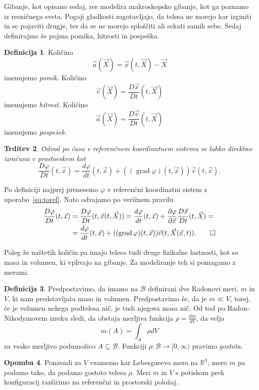 \documentclass[a4paper,twoside]{article}
\theoremstyle{definition} %
\newtheorem{definicija}{Definicija}[section]
\newtheorem{opomba}[definicija]{Opomba}
\theoremstyle{plain} %
\newtheorem{trditev}[definicija]{Trditev}
\numberwithin{equation}{section}
\newcommand{\R}{\mathbb R}
\newcommand{\B}{\mathcal{B}}
\newcommand{\grad}{\operatorname{grad}}
\renewcommand{\phi}{\varphi}
\newcommand{\dpar}[2]{\ensuremath{\frac{\partial #1}{\partial #2}}}
\newcommand{\dd}[2]{\ensuremath{\frac{d #1}{d #2}}}
\newcommand{\ddt}[1]{\dd{#1}{t}}
\newcommand{\DD}[2]{\ensuremath{\frac{D #1}{D #2}}}
\newcommand{\DDt}[1]{\DD{#1}{t}}
\newcommand{\vv}{\vec{v}}
\newcommand{\vu}{\vec{u}}
\newcommand{\va}{\vec{a}}
\newcommand{\vX}{\vec{X}}
\newcommand{\vx}{\vec{x}}
\begin{document}
Gibanje, kot opisano sedaj, res modelira makroskopsko gibanje, kot ga poznamo iz
resničnega sveta. Pogoji gladkosti zagotavljajo, da telesa ne morejo kar
izginiti in se pojaviti drugje, ter da se ne morejo sploščiti ali sekati samih
sebe. Sedaj definirajmo še pojma pomika, hitrosti in pospeška.

\begin{definicija}
  Količino \[ \vu(\vX) = \vx(t, \vX) - \vX \] imenujemo \emph{pomik}.
  Količino \[ \vv(\vX) = \DDt{\vx}(t, \vX) \] imenujemo \emph{hitrost}.
  Količino \[ \va(\vX) = \DDt{\vv}(t, \vX) \] imenujemo \emph{pospešek}.
\end{definicija}
\begin{trditev}
  Odvod po času v referenčnem koordinatnem sistemu se lahko direktno izračuna v
  prostorskem kot
  \[
  \DDt{\phi}(t, \vx) = \ddt{\phi}(t, \vx) + ((\grad \phi)(t, \vx)) \vv(t, \vx).
  \]
\end{trditev}
\proof
  Po definiciji najprej prenesemo $\phi$ v referenčni koordinatni sistem z
  uporabo~\ref{eq:toref}. Nato odvajamo po verižnem pravilu
  \begin{align*}
    \DDt \phi(t, \vx) &= \DDt \phi(t, \vx(t, \vX)) =
    \ddt \phi(t, \vx) + \dpar{\phi}{\vx} \DDt{\vx} (t, \vX) = \\
    &= \ddt \phi(t, \vx) + ((\grad \phi)(t, \vx)) \vv(t, \vX(\vx, t)). \qedhere
  \end{align*}
\endproof

Poleg že naštetih količin pa imajo telesa tudi druge fizikalne lastnosti, kot so
masa in volumen, ki vplivajo na gibanje. Za modeliranje teh si pomagamo z
merami.

\begin{definicija}
  Predpostavimo, da imamo na $\B$ definirani dve Radonovi meri, $m$ in
  $V$, ki nam predstavljata maso in volumen. Predpostavimo še, da je $m \ll V$,
  torej, če je volumen nekega podtelesa nič, je tudi njegova masa nič. Od tod po
  Radon-Nikodymovem izreku sledi, da obstaja merljiva funkcija $\rho =
  \dd{m}{V}$, da velja
  \[
    m(A) = \int_{A} \rho dV
  \]
  za vsako merljivo podmnožico $A \subseteq \B$.
  Funkciji $\rho\colon\B\to[0, \infty)$ pravimo \emph{gostota}.
\end{definicija}
\begin{opomba}
  Ponavadi za $V$ vzamemo kar Lebesgueevo mero na $\R^3$, mero $m$ pa podamo tako, da
  podamo gostoto telesa $\rho$. Meri $m$ in $V$ s potiskom prek konfiguracij
  razširimo na referenčni in prostorski položaj.
\end{opomba}
\end{document}
